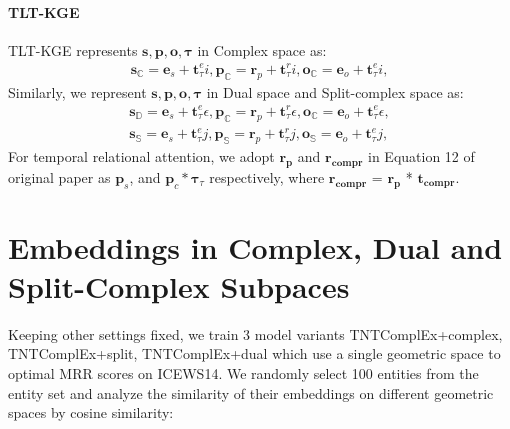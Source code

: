 \documentclass[letterpaper]{article} %
\begin{document}
\paragraph{TLT-KGE}
TLT-KGE \cite{tltcomplexzhang2022along} represents $\boldsymbol{s,p,o, \tau}$ in Complex space as:
\begin{equation}
\begin{aligned}
        \boldsymbol{s_{\mathbb{C}}}=\boldsymbol{e}_{s} + \boldsymbol{t}_{\tau}^{e}i, \boldsymbol{p_{\mathbb{C}}}=\boldsymbol{r}_{p} + \boldsymbol{t}_{\tau}^{r}i,  \boldsymbol{o_{\mathbb{C}}}=\boldsymbol{e}_{o} + \boldsymbol{t}_{\tau}^{e}i, %
\end{aligned}
\end{equation}
Similarly, we represent $\boldsymbol{s,p,o, \tau}$ in Dual space and Split-complex space as:
\begin{equation}
\begin{aligned}
        \boldsymbol{s_{\mathbb{D}}}=\boldsymbol{e}_{s} + \boldsymbol{t}_{\tau}^{e}\epsilon, \boldsymbol{p_{\mathbb{C}}}=\boldsymbol{r}_{p} + \boldsymbol{t}_{\tau}^{r}\epsilon,  \boldsymbol{o_{\mathbb{C}}}=\boldsymbol{e}_{o} + \boldsymbol{t}_{\tau}^{e}\epsilon, \\
        \boldsymbol{s_{\mathbb{S}}}=\boldsymbol{e}_{s} + \boldsymbol{t}_{\tau}^{e}j, \boldsymbol{p_{\mathbb{S}}}=\boldsymbol{r}_{p} + \boldsymbol{t}_{\tau}^{r}j,  \boldsymbol{o_{\mathbb{S}}}=\boldsymbol{e}_{o} + \boldsymbol{t}_{\tau}^{e}j,
\end{aligned}
\end{equation}
For temporal relational attention, we adopt $\boldsymbol{r_{p}}$ and $\boldsymbol{r_{compr}}$ in Equation 12 of original paper as  $\boldsymbol{p}_{s}$, and $\boldsymbol{p}_{c}*\boldsymbol{\tau}_{\tau}$ respectively, where $\boldsymbol{r_{compr}}$ = $\boldsymbol{r_{p}}$ *  $\boldsymbol{t_{compr}}$.

\section{Embeddings in Complex, Dual and Split-Complex Subpaces}
\label{sec:embeddings_subspaces}
Keeping other settings fixed, we train 3 model variants TNTComplEx+complex, TNTComplEx+split, TNTComplEx+dual which use a single geometric space to optimal MRR scores on ICEWS14. We randomly select 100 entities from the entity set and analyze the similarity of their embeddings on different geometric spaces by cosine similarity:
\end{document}
